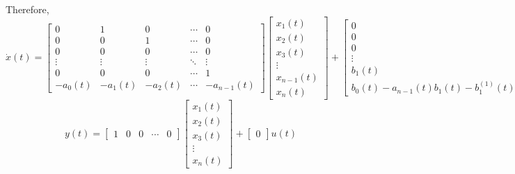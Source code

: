 Therefore,
\[
    \boxed{
        \dot{x}(t)
        =
        \begin{bmatrix}
            0       & 1       & 0       & \cdots & 0           \\
            0       & 0       & 1       & \cdots & 0           \\
            0       & 0       & 0       & \cdots & 0           \\
            \vdots  & \vdots  & \vdots  & \ddots & \vdots      \\
            0       & 0       & 0       & \cdots & 1           \\
            -a_0(t) & -a_1(t) & -a_2(t) & \cdots & -a_{n-1}(t)
        \end{bmatrix}
        \begin{bmatrix}
            x_1(t)     \\
            x_2(t)     \\
            x_3(t)     \\
            \vdots     \\
            x_{n-1}(t) \\
            x_n(t)
        \end{bmatrix}
        +
        \begin{bmatrix}
            0      \\
            0      \\
            0      \\
            \vdots \\
            b_1(t) \\
            b_0(t) - a_{n-1}(t)b_1(t) - b_1^{(1)}(t)
        \end{bmatrix}
        u(t)
    }
\]
\[
    \boxed{
        y(t)
        =
        \begin{bmatrix}
            1 & 0 & 0 & \cdots & 0
        \end{bmatrix}
        \begin{bmatrix}
            x_1(t) \\
            x_2(t) \\
            x_3(t) \\
            \vdots \\
            x_n(t)
        \end{bmatrix}
        +
        \begin{bmatrix}
            0
        \end{bmatrix}
        u(t)
    }
\]
